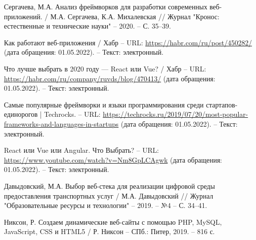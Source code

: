 \begin{thebibliography}{00}
        Сергачева, М.А. Анализ фреймворков для разработки современных веб-приложений.
        /
        М.А. Сергачева, К.А. Михалевская
        //
        Журнал "Кронос: естественные и технические науки"
        --
        2020.
        --
        С. 35--39.

        Как работают веб-приложения / Хабр
        --
        URL:
        \href{https://habr.com/ru/post/450282/}{https://habr.com/ru/post/450282/}
        (дата обращения: 01.05.2022).
        --
        Текст: электронный.

        Что лучше выбрать в 2020 году — React или Vue? / Хабр
        --
        URL:
        \href{https://habr.com/ru/company/ruvds/blog/470413/}{https://habr.com/ru/company/ruvds/blog/470413/}
        (дата обращения: 01.05.2022).
        --
        Текст: электронный.

        Самые популярные фреймворки и языки программирования среди стартапов-единорогов | Techrocks.
        --
        URL:
        \href{https://techrocks.ru/2019/07/20/most-popular-frameworks-and-languages-in-startups}{https://techrocks.ru/2019/07/20/most-popular-frameworks-and-languages-in-startups}
        (дата обращения: 01.05.2022).
        --
        Текст: электронный.


        React или Vue или Angular. Что Выбрать?
        --
        URL:
        \href{https://www.youtube.com/watch?v=Nm8GpLCAgwk}{https://www.youtube.com/watch?v=Nm8GpLCAgwk}
        (дата обращения: 01.05.2022).
        --
        Текст: электронный.

        Давыдовский, М.А. Выбор веб-стека для реализации цифровой среды предоставления транспортных услуг
        /
        М.А. Давыдовский
        //
        Журнал "Образовательные ресурсы и технологии"
        --
        2019.
        --
        №4
        --
        С. 34--41.

        Никсон, Р. Создаем динамические веб-сайты с помощью PHP, MySQL, JavaScript, CSS и HTML5
        /
        Р. Никсон
        --
        СПб.: Питер,
        2019.
        --
        816 с.


\end{thebibliography}

